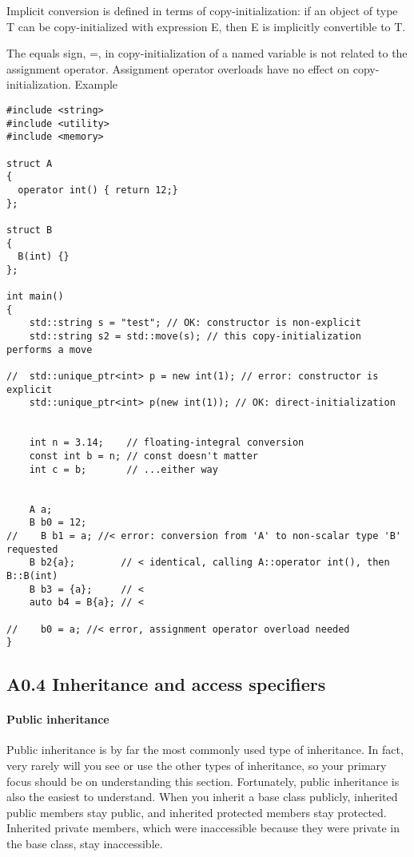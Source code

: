 \documentclass{book}
\begin{document}
Implicit conversion is defined in terms of copy-initialization: if an object of type T can be copy-initialized with expression E, then E is implicitly convertible to T.

The equals sign, =, in copy-initialization of a named variable is not related to the assignment operator. Assignment operator overloads have no effect on copy-initialization.
Example
\begin{lstlisting}
#include <string>
#include <utility>
#include <memory>
 
struct A 
{
  operator int() { return 12;}
};
 
struct B 
{
  B(int) {}
};
 
int main()
{
    std::string s = "test"; // OK: constructor is non-explicit
    std::string s2 = std::move(s); // this copy-initialization performs a move
 
//  std::unique_ptr<int> p = new int(1); // error: constructor is explicit
    std::unique_ptr<int> p(new int(1)); // OK: direct-initialization
 
 
    int n = 3.14;    // floating-integral conversion
    const int b = n; // const doesn't matter
    int c = b;       // ...either way
 
 
    A a;
    B b0 = 12;
//    B b1 = a; //< error: conversion from 'A' to non-scalar type 'B' requested
    B b2{a};        // < identical, calling A::operator int(), then B::B(int)
    B b3 = {a};     // <
    auto b4 = B{a}; // <
 
//    b0 = a; //< error, assignment operator overload needed 
}

\end{lstlisting}

\subsection{A0.4 Inheritance and access specifiers}
\paragraph{Public inheritance}

Public inheritance is by far the most commonly used type of inheritance. In fact, very rarely will you see or use the other types of inheritance,
so your primary focus should be on understanding this section. Fortunately, public inheritance is also the easiest to understand. When you inherit a base class publicly,
inherited public members stay public, and inherited protected members stay protected.
Inherited private members, which were inaccessible because they were private in the base class, stay inaccessible.
\end{document}
